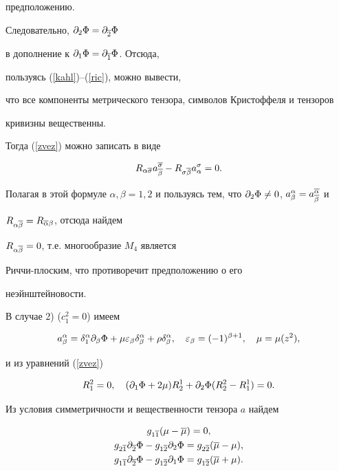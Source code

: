 предположению.


Следовательно, $\partial_ 2\Phi = \partial_{\overline 2}\Phi$


в дополнение к $\partial_ 1\Phi = \partial_{\overline 1}\Phi$. Отсюда,


пользуясь (\ref{kahl})--(\ref{ric}), можно вывести,


что все компоненты метрического тензора, символов Кристоффеля и тензоров


кривизны вещественны.


Тогда (\ref{zvez}) можно записать в виде


$$


R_{\alpha\ol\sigma}a^{\ol\sigma}_{\ol\beta} -


R_{\sigma\ol\beta}a^\sigma_\alpha = 0.


$$


Полагая в этой формуле $\alpha,\beta=1,2$ и пользуясь тем, что $\pl 2


\Phi\neq 0$, $a^\alpha_\beta=a^{\ol\alpha}_{\ol\beta}$ и


$R_{\alpha\overline\beta}=R_{\overline\alpha\beta}$, отсюда найдем


$R_{\alpha\overline\beta}=0$, т.е. многообразие $M_4$ является


Риччи-плоским, что противоречит предположению о его


неэйнштейновости.





В случае 2) ($c^2_1=0$) имеем


$$


a^\alpha_\beta = \delta^\alpha_1 \pl\beta \Phi+


\mu \ve\beta \delta^\alpha_\beta + \rho \delta^\alpha_\beta,


\quad \ve\beta = (-1)^{\beta+1}, \quad


\mu=\mu (z^2),


$$


и из уравнений (\ref{zvez})


\begin{equation}


\label{sh52}


R^2_1 = 0, \quad (\pl 1\Phi +2\mu) R^1_2 + \pl 2 \Phi (R^2_2-R^1_1)=0.


\end{equation}


Из условия симметричности и вещественности тензора $a$ найдем


\begin{gather}


\label{sh53}


g_{1\ol 1}(\mu -\ol\mu)=0,\\


g_{2\ol 1}\pl{\ol 2}\Phi - g_{1\ol 2}\pl 2 \Phi =


g_{2\ol 2}(\ol\mu-\mu),\notag\\


\label{sh54}


g_{1\ol 1}\pl{\ol 2}\Phi - g_{1\ol 2}\pl 1 \Phi = g_{1\ol


2}(\ol\mu+\mu).


\end{gather}





